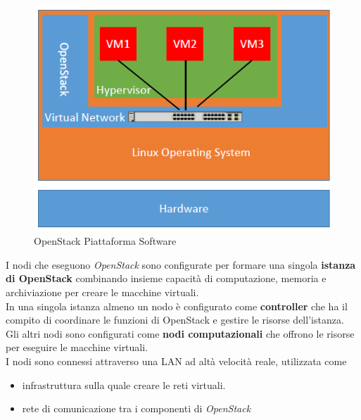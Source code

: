 \documentclass{article}
\begin{document}
\begin{figure}[H]
    \centering
    \includegraphics[scale=0.5]{img/os_platform.png}
    \caption{OpenStack Piattaforma Software}
\end{figure}\noindent
I nodi che eseguono \textit{OpenStack} sono configurate per formare una singola \textbf{istanza di OpenStack} combinando insieme capacità di computazione, memoria e archiviazione per creare le macchine virtuali.\\
In una singola istanza almeno un nodo è configurato come \textbf{controller} che ha il compito di coordinare le funzioni di OpenStack e gestire le risorse dell'istanza. Gli altri nodi sono configurati come \textbf{nodi computazionali} che offrono le risorse per eseguire le macchine virtuali. \\
I nodi sono connessi attraverso una LAN ad altà velocità reale, utilizzata come
\begin{itemize}
    \item infrastruttura sulla quale creare le reti virtuali.
    \item rete di comunicazione tra i componenti di \textit{OpenStack}
\end{itemize}
\end{document}
